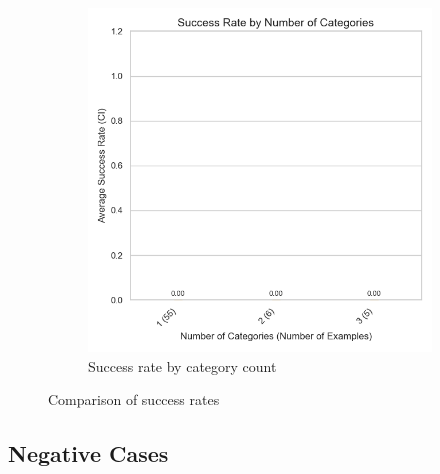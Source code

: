 \begin{figure}
\begin{subfigure}{0.48\linewidth}
        \includegraphics[width=\linewidth]{fig/success_rate_by_category_count}
        \caption{Success rate by category count}
        \label{fig:success_rate_by_category_count}
    \end{subfigure}
    \caption{Comparison of success rates}
    \label{fig:success_rate_comparison}
\end{figure}


\subsection{Negative Cases}
\label{subsec:negative-cases}

